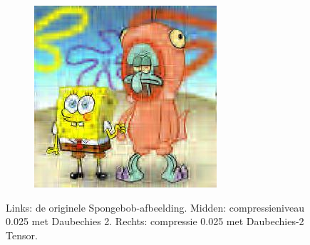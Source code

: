 \begin{figure}
\begin{subfigure}[t]{0.32\textwidth}
	\end{subfigure}
	\begin{subfigure}[t]{0.32\textwidth}
	\includegraphics[width=\linewidth]{plaatjes/spongebob_db2_t_0_025.jpg}
	\end{subfigure}
	\caption{Links: de originele Spongebob-afbeelding. Midden: compressieniveau 0.025 met Daubechies 2. Rechts: compressie 0.025 met Daubechies-2 Tensor.}
	\label{fig:tensor_start}
\end{figure}
